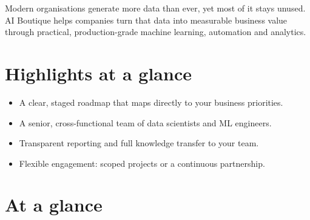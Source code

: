 
Modern organisations generate more data than ever, yet most of it stays
unused. AI Boutique helps companies turn that data into measurable business
value through practical, production-grade machine learning, automation and
analytics.


\section{Highlights at a glance}
\begin{itemize}
  \item A clear, staged roadmap that maps directly to your business priorities.
  \item A senior, cross-functional team of data scientists and ML engineers.
  \item Transparent reporting and full knowledge transfer to your team.
  \item Flexible engagement: scoped projects or a continuous partnership.
\end{itemize}

\section{At a glance}
\begin{center}
  \qquad\qquad
  \qquad\qquad
\end{center}
